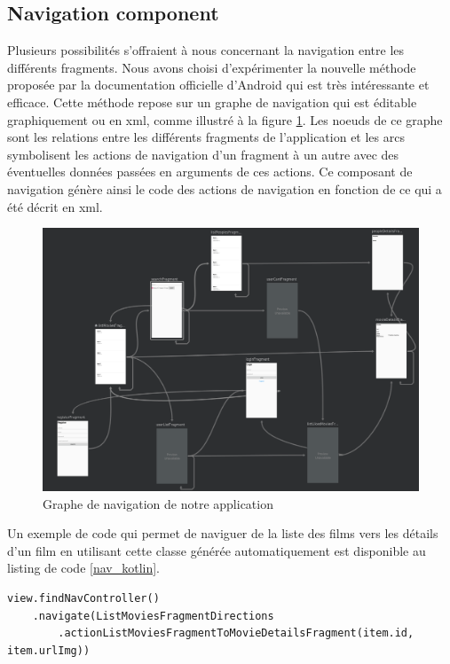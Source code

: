 \subsection{Navigation component}
Plusieurs possibilités s'offraient à nous concernant la navigation entre les différents fragments. Nous avons choisi d'expérimenter la nouvelle méthode proposée par la documentation officielle d'Android \cite{docandroid} qui est très intéressante et efficace.
Cette méthode repose sur un graphe de navigation qui est éditable graphiquement ou en \acrshort{xml}, comme illustré à la figure \ref{nav_graph}. Les noeuds de ce graphe sont les relations entre les différents fragments de l'application et les arcs symbolisent les actions de navigation d'un fragment à un autre avec des éventuelles données passées en arguments de ces actions. Ce composant de navigation génère ainsi le code des actions de navigation en fonction de ce qui a été décrit en \acrshort{xml}.
\begin{figure}
    \begin{center}
        \includegraphics[width=1\textwidth]{img/screenshots/nav_graph.png}
    \end{center}
    \caption{Graphe de navigation de notre application}
    \label{nav_graph}
\end{figure}

Un exemple de code qui permet de naviguer de la liste des films vers les détails d'un film en utilisant cette classe générée automatiquement est disponible au listing de code \ref{nav_kotlin}.
\bigbreak
\begin{code}
    \begin{verbatim}
view.findNavController()
    .navigate(ListMoviesFragmentDirections
        .actionListMoviesFragmentToMovieDetailsFragment(item.id, item.urlImg))
    \end{verbatim}
    \caption{Exemple de navigation}
    \label{nav_kotlin}
\end{code}
\bigbreak


